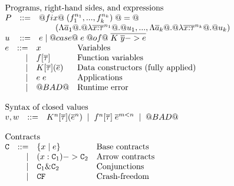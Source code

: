 \begin{figure}
\[\begin{array}{l} 
\begin{array}{lrll}
\multicolumn{3}{l}{\text{Programs, right-hand sides, and expressions}} \\
P   & ::= & @fix@\;(f_1^{\ar_1},...,f_k^{\ar_k})\;@=@ \\ 
    &     & \quad\quad (\Lambda\as_1 @.@ \lambda{\oln{x{:}\tau}{\ar_1}} @.@ u_1,...,
                                                \Lambda\as_k @.@ \lambda{\oln{x{:}\tau}{\ar_k}} @.@ u_k) \\
u   & ::= & e \mid @case@\;e\;@of@\;\ol{K\;\ol{y} -> e} \\ 
\end{array}
\\ 
\begin{array}{lrll}
e  & ::=  & x            & \text{Variables} \\ 
   & \mid & f[\ol{\tau}] & \text{Function variables} \\ 
   & \mid & K[\ol{\tau}](\ol{e}) & \text{Data constructors (fully applied)} \\
   & \mid & e\;e         & \text{Applications} \\
   & \mid & @BAD@        & \text{Runtime error} \\ 
\end{array}\\ \\ 
\begin{array}{lrll}
\multicolumn{3}{l}{\text{Syntax of closed values}} \\
 v,w & ::= & K^\ar[\ol{\tau}](\oln{e}{\ar}) \;\mid\; f^\ar[\ol{\tau}]\;\oln{e}{m < \ar} \;\mid\; @BAD@ \\ \\ 
\end{array}
\\ 
\begin{array}{lrll}
\multicolumn{3}{l}{\text{Contracts}} \\
 \Ct & ::=  & \{ x \mid e \}        & \text{Base contracts}  \\ 
     & \mid &  (x : \Ct_1) -> \Ct_2      & \text{Arrow contracts} \\ 
     & \mid & \Ct_1 \& \Ct_2             & \text{Conjunctions}   \\ 
     & \mid & \CF                        & \text{Crash-freedom}   \\

\end{array}
\end{array}\]
\end{figure}
